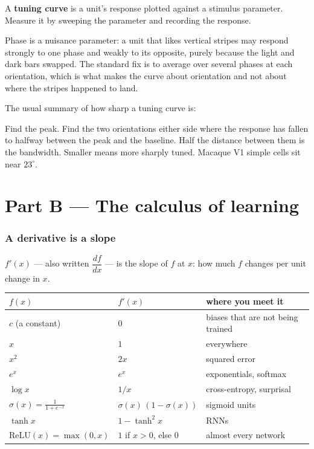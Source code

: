 \documentclass[11pt]{article}
\begin{document}
A \textbf{tuning curve} is a unit's response plotted against a stimulus
parameter. Measure it by sweeping the parameter and recording the response.

Phase is a nuisance parameter: a unit that likes vertical stripes may respond
strongly to one phase and weakly to its opposite, purely because the light and
dark bars swapped. The standard fix is to average over several phases at each
orientation, which is what makes the curve about orientation and not about
where the stripes happened to land.

The usual summary of how sharp a tuning curve is:

\begin{keybox}
 Find the peak. Find the two
orientations either side where the response has fallen to halfway between the
peak and the baseline. Half the distance between them is the bandwidth. Smaller
means more sharply tuned. Macaque V1 simple cells sit near $23^\circ$.
\end{keybox}

\part*{Part B --- The calculus of learning}

\section{A derivative is a slope}

$f'(x)$ --- also written $\dfrac{df}{dx}$ --- is the slope of $f$ at $x$: how much
$f$ changes per unit change in $x$.

\begin{center}
\begin{tabular}{@{}lll@{}}
\toprule
$f(x)$ & $f'(x)$ & where you meet it \\
\midrule
$c$ (a constant)      & $0$                & biases that are not being trained \\
$x$                   & $1$                & everywhere \\
$x^2$                 & $2x$               & squared error \\
$e^{x}$               & $e^{x}$            & exponentials, softmax \\
$\log x$              & $1/x$              & cross-entropy, surprisal \\
$\sigma(x) = \frac{1}{1+e^{-x}}$ & $\sigma(x)\,(1-\sigma(x))$ & sigmoid units \\
$\tanh x$             & $1 - \tanh^2 x$    & RNNs \\
$\mathrm{ReLU}(x) = \max(0,x)$ & $1$ if $x>0$, else $0$ & almost every network \\
\bottomrule
\end{tabular}
\end{center}
\end{document}
